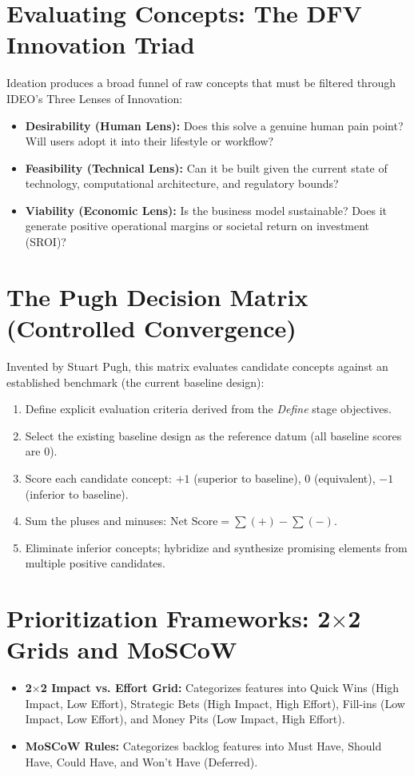 \section{Evaluating Concepts: The DFV Innovation Triad}
Ideation produces a broad funnel of raw concepts that must be filtered through IDEO's Three Lenses of Innovation:
\begin{itemize}
    \item \textbf{Desirability (Human Lens):} Does this solve a genuine human pain point? Will users adopt it into their lifestyle or workflow?
    \item \textbf{Feasibility (Technical Lens):} Can it be built given the current state of technology, computational architecture, and regulatory bounds?
    \item \textbf{Viability (Economic Lens):} Is the business model sustainable? Does it generate positive operational margins or societal return on investment (SROI)?
\end{itemize}

\section{The Pugh Decision Matrix (Controlled Convergence)}
Invented by Stuart Pugh, this matrix evaluates candidate concepts against an established benchmark (the current baseline design):
\begin{methodbox}
\begin{enumerate}[leftmargin=1.5em]
    \item Define explicit evaluation criteria derived from the \textit{Define} stage objectives.
    \item Select the existing baseline design as the reference datum (all baseline scores are 0).
    \item Score each candidate concept: $+1$ (superior to baseline), $0$ (equivalent), $-1$ (inferior to baseline).
    \item Sum the pluses and minuses: $\text{Net Score} = \sum (+) - \sum (-)$.
    \item Eliminate inferior concepts; hybridize and synthesize promising elements from multiple positive candidates.
\end{enumerate}
\end{methodbox}

\section{Prioritization Frameworks: 2$\times$2 Grids and MoSCoW}
\begin{itemize}
    \item \textbf{2$\times$2 Impact vs. Effort Grid:} Categorizes features into Quick Wins (High Impact, Low Effort), Strategic Bets (High Impact, High Effort), Fill-ins (Low Impact, Low Effort), and Money Pits (Low Impact, High Effort).
    \item \textbf{MoSCoW Rules:} Categorizes backlog features into Must Have, Should Have, Could Have, and Won't Have (Deferred).
\end{itemize}

